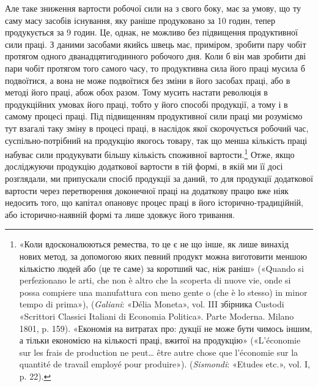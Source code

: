 Але таке зниження вартости робочої сили на  з свого боку,
має за умову, що ту саму масу засобів існування, яку раніше
продуковано за 10 годин, тепер продукується за 9 годин. Це, однак,
не можливо без підвищення продуктивної сили праці. З даними
засобами якийсь швець має, приміром, зробити пару чобіт
протягом одного дванадцятигодинного робочого дня. Коли б він
мав зробити дві пари чобіт протягом того самого часу, то продуктивна
сила його праці мусила б подвоїтися, а вона не може подвоїтися
без зміни в його засобах праці, або в методі його праці,
абож обох разом. Тому мусить настати революція в продукційних
умовах його праці, тобто у його способі продукції, а тому і в самому
процесі праці. Під підвищенням продуктивної сили праці ми розуміємо
тут взагалі таку зміну в процесі праці, в наслідок якої
скорочується робочий час, суспільно-потрібний на продукцію
якогось товару, так що менша кількість праці набуває сили продукувати
більшу кількість споживної вартости.\footnote{
«Коли вдосконалюються ремества, то це є не що інше, як лише
винахід нових метод, за допомогою яких певний продукт можна виготовити
меншою кількістю людей або (це те саме) за коротший час, ніж
раніш» («Quando si perfezionano le arti, che non è altro che la scoperta
di nuove vie, onde si possa compiere una manufattura con meno gente o
(che è lo stesso) in minor tempo di prima»), (\emph{Galiani}: «Délia Moneta»,
vol. III збірника Custodi «Scrittori Classici Italiani di Economia Politica».
Parte Moderna. Milano 1801, p. 159). «Економія на витратах про:
дукції не може бути чимось іншим, а тільки економією на кількості
праці, вжитої на продукцію» («L'économie sur les frais de production
ne peut\dots{} être autre chose que l’économie sur la quantité de travail employé
pour produire»). (\emph{Sismondi}: «Etudes etc.», vol. I, p. 22).
} Отже, якщо
досліджуючи продукцію додаткової вартости в тій формі, в якій
ми її досі розглядали, ми припускали спосіб продукції за даний,
то для продукції додаткової вартости через перетворення доконечної
праці на додаткову працю вже ніяк недосить того, що
капітал опановує процес праці в його історично-традиційній,
або історично-наявній формі та лише здовжує його тривання.
\parbreak{}  %
